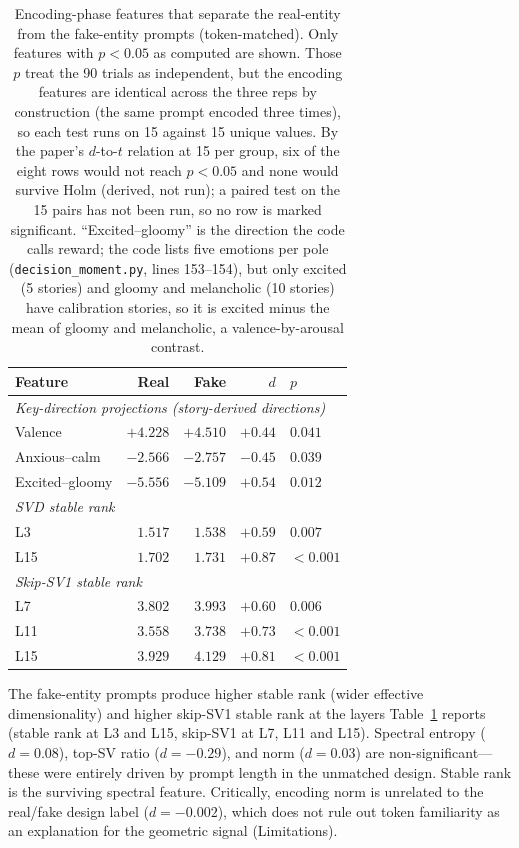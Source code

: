 \documentclass[11pt,a4paper]{article}
\begin{document}
\begin{table}[H]
\centering
\caption{Encoding-phase features that separate the real-entity from the
fake-entity prompts (token-matched). Only features with $p{<}0.05$ as
computed are shown. Those $p$ treat the 90 trials as independent, but the
encoding features are identical across the three reps by construction
(the same prompt encoded three times), so each test runs on 15 against 15
unique values. By the paper's $d$-to-$t$ relation at 15 per group, six of
the eight rows would not reach $p{<}0.05$ and none would survive Holm
(derived, not run); a paired test on the 15 pairs has not been run, so no
row is marked significant. ``Excited--gloomy'' is the direction the code
calls reward; the code lists five emotions per pole (\texttt{decision\_moment.py}, lines 153--154), but only excited (5 stories) and gloomy and melancholic (10 stories) have calibration stories, so it is excited minus the mean of gloomy and melancholic, a valence-by-arousal
contrast.}
\label{tab:encoding}
\begin{tabular}{lrrrl}
\toprule
Feature & Real & Fake & $d$ & $p$ \\
\midrule
\multicolumn{5}{l}{\emph{Key-direction projections (story-derived directions)}} \\
Valence & $+4.228$ & $+4.510$ & $+0.44$ & $0.041$ \\
Anxious--calm & $-2.566$ & $-2.757$ & $-0.45$ & $0.039$ \\
Excited--gloomy & $-5.556$ & $-5.109$ & $+0.54$ & $0.012$ \\
\midrule
\multicolumn{5}{l}{\emph{SVD stable rank}} \\
L3 & $1.517$ & $1.538$ & $+0.59$ & $0.007$ \\
L15 & $1.702$ & $1.731$ & $+0.87$ & ${<}0.001$ \\
\midrule
\multicolumn{5}{l}{\emph{Skip-SV1 stable rank}} \\
L7 & $3.802$ & $3.993$ & $+0.60$ & $0.006$ \\
L11 & $3.558$ & $3.738$ & $+0.73$ & ${<}0.001$ \\
L15 & $3.929$ & $4.129$ & $+0.81$ & ${<}0.001$ \\
\bottomrule
\end{tabular}
\end{table}

The fake-entity prompts produce higher stable rank (wider effective
dimensionality) and higher skip-SV1 stable rank at the layers Table~\ref{tab:encoding} reports (stable rank at L3 and
L15, skip-SV1 at L7, L11 and L15).
Spectral entropy ($d{=}0.08$), top-SV ratio ($d{=}-0.29$), and norm
($d{=}0.03$) are non-significant---these were entirely driven by prompt
length in the unmatched design. Stable rank is the surviving spectral
feature. Critically, encoding norm is unrelated to the real/fake design
label ($d{=}-0.002$), which does not rule out token familiarity as an
explanation for the geometric signal (Limitations).
\end{document}
